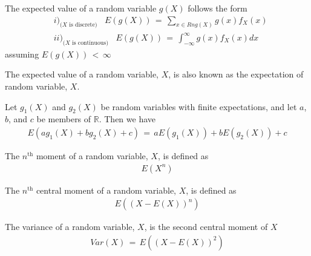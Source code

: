 \begin{definition}
    The expected value of a random variable $g(X)$ follows the form
    \begin{align*}
        &i)_\text{($X$ is discrete)} \hspace{10pt} E(g(X)) \hspace{2pt} = \hspace{2pt} \sum_{x \in Rng(X)} g(x)f_{X}(x) \\[2ex]
        &ii)_\text{($X$ is continuous)} \hspace{10pt} E(g(X)) \hspace{2pt} = \hspace{2pt} \int_{-\infty}^{\infty} g(x)f_{X}(x)dx
    \end{align*}
    assuming $E(g(X)) \hspace{2pt} < \hspace{2pt} \infty$
\end{definition}

The expected value of a random variable, $X$, is also known as the expectation of random variable, $X$.

\begin{theorem}
    \label{expectation_linear_combination}
    Let $g_{1}(X)$ and $g_{2}(X)$ be random variables with finite expectations, and let $a$, $b$, and $c$ be members of $\mathbb{R}$. Then we have
    \begin{align*}
        E(ag_{1}(X) + bg_{2}(X) + c) \hspace{2pt} = \hspace{2pt} aE(g_{1}(X)) + bE(g_{2}(X)) + c
    \end{align*}
\end{theorem}

\begin{definition}
    \label{nth_moment}
    The $n^{\text{th}}$ moment of a random variable, $X$, is defined as
    \begin{align*}
        E(X^{n})
    \end{align*}
\end{definition}

\begin{definition}
    The $n^{\text{th}}$ central moment of a random variable, $X$, is defined as
    \begin{align*}
        E((X - E(X))^{n})
    \end{align*}
\end{definition}

\begin{definition}
    The variance of a random variable, $X$, is the second central moment of $X$
    \begin{align*}
        Var(X) \hspace{2pt} = \hspace{2pt} E((X - E(X))^{2}) 
    \end{align*}
\end{definition}

